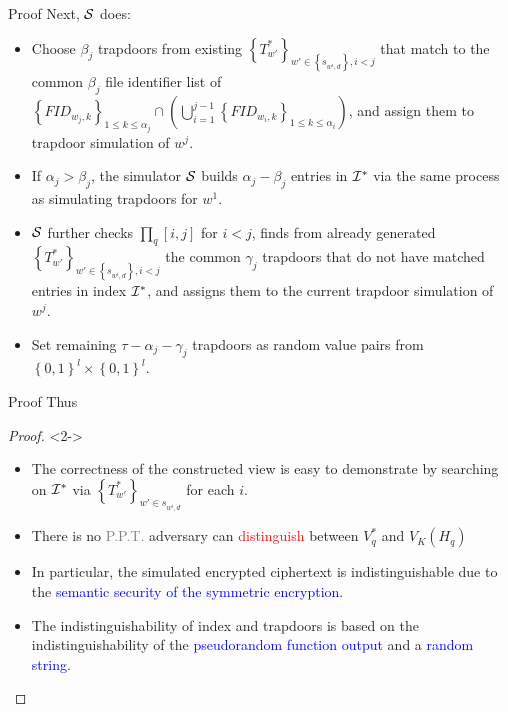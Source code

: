\documentclass[handout]{beamer}
\begin{document}
\begin{frame}{Proof}
	Next, $\cal S$ does:
	\begin{itemize}
		\item<2-> Choose ${\beta _j}$ trapdoors from existing ${\left\{ {T_{w'}^*} \right\}_{w' \in \left\{ {{s_{{w^i},d}}} \right\},i < j}}$ that match to the common ${\beta _j}$ file identifier list of ${\left\{ {FI{D_{{w_j},k}}} \right\}_{1 \le k \le {\alpha _j}}} \cap (\bigcup\nolimits_{i = 1}^{j - 1} {{{\left\{ {FI{D_{{w_i},k}}} \right\}}_{1 \le k \le {\alpha _i}}}} )$, and assign them to trapdoor simulation of $w^j$.
		\item<3-> If $\alpha_j > \beta_j$, the simulator $\cal S$ builds $\alpha_j - \beta_j$ entries in ${{{\cal I}^*}}$ via the same process as simulating trapdoors for $w^1$.
		\item<4-> $\cal S$ further checks ${{\prod _q}[i,j]}$ for $i < j$, finds from already generated ${\left\{ {T_{w'}^*} \right\}_{w' \in \left\{ {{s_{{w^i},d}}} \right\},i < j}}$ the common ${\gamma _j}$ trapdoors that do not have matched entries in index ${{{\cal I}^*}}$, and assigns them to the current trapdoor simulation of $w^j$.
		\item<5-> Set remaining $\tau  - {\alpha _j} - {\gamma _j}$ trapdoors as random value pairs from ${\left\{ {0,1} \right\}^l} \times {\left\{ {0,1} \right\}^l}$.
 \end{itemize}
\end{frame}

\begin{frame}{Proof}
	Thus
	\begin{proof}<2->
		\begin{itemize}
			\item<3-> The correctness of the constructed view is easy to demonstrate by searching on ${{{\cal I}^*}}$ via ${\left\{ {T_{w'}^*} \right\}_{w' \in {s_{{w^i},d}}}}$ for each $i$.
			\item<4-> There is no \textcolor{grey}{P.P.T.} adversary can \textcolor{red}{distinguish} between $V_q^*$ and ${V_K}({H_q})$
			\item<5-> In particular, the simulated encrypted ciphertext
			is indistinguishable due to the \textcolor{blue}{semantic security of the
			symmetric encryption}.
			\item<6-> The indistinguishability of index and trapdoors is based on the indistinguishability of the \textcolor{blue}{pseudorandom function output} and a \textcolor{blue}{random string}.
		\end{itemize}
	\end{proof}
\end{frame}
\end{document}
